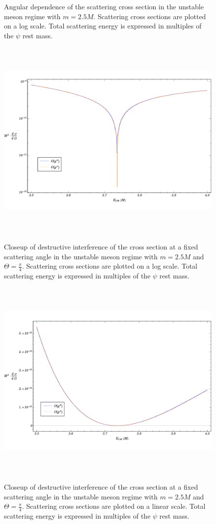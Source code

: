 \documentclass{article}
\begin{document}
\begin{figure}
\begin{center}
\vspace*{-1cm}
\caption{Angular dependence of the scattering cross section in the unstable meson regime with $m = 2.5 M$. Scattering cross sections are plotted on a log scale. Total scattering energy is expressed in multiples of the $\psi$ rest mass.} 
\label{unstable-angular}
\end{center}
\end{figure} 


\begin{figure}
\begin{center}
\includegraphics[width=15cm, height=10cm]{AntiResonance}
\caption{Closeup of destructive interference of the cross section at a fixed scattering angle in the unstable meson regime with $m = 2.5 M$ and $\Theta = \frac{\pi}{4}$. Scattering cross sections are plotted on a log scale. Total scattering energy is expressed in multiples of the $\psi$ rest mass.} 
\label{AntiResonance}
\includegraphics[width=15cm, height=10cm]{NoLogAntiResonance}
\caption{Closeup of destructive interference of the cross section at a fixed scattering angle in the unstable meson regime with $m = 2.5 M$ and $\Theta = \frac{\pi}{4}$. Scattering cross sections are plotted on a linear scale. Total scattering energy is expressed in multiples of the $\psi$ rest mass.} 
\label{NoLogAntiResonance}
\end{center}
\end{figure}
\end{document}
